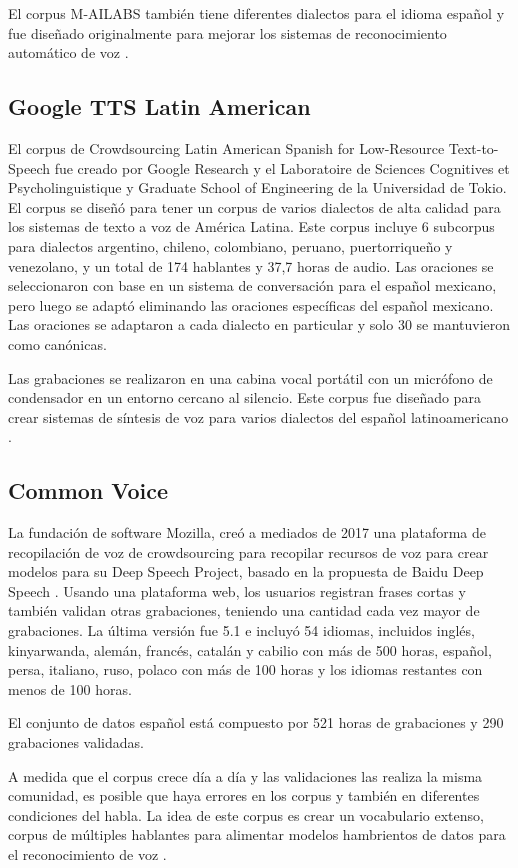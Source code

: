 El corpus M-AILABS también tiene diferentes dialectos para el idioma español y fue diseñado originalmente para mejorar los sistemas de reconocimiento automático de voz \cite{M-AILABS}.

\subsection{Google TTS Latin American}

El corpus de Crowdsourcing Latin American Spanish for Low-Resource Text-to-Speech fue creado por Google Research y el Laboratoire de Sciences Cognitives et Psycholinguistique y Graduate School of Engineering de la Universidad de Tokio. El corpus se diseñó para tener un corpus de varios dialectos de alta calidad para los sistemas de texto a voz de América Latina. Este corpus incluye 6 subcorpus para dialectos argentino, chileno, colombiano, peruano, puertorriqueño y venezolano, y un total de 174 hablantes y 37,7 horas de audio. Las oraciones se seleccionaron con base en un sistema de conversación para el español mexicano, pero luego se adaptó eliminando las oraciones específicas del español mexicano. Las oraciones se adaptaron a cada dialecto en particular y solo 30 se mantuvieron como canónicas.

Las grabaciones se realizaron en una cabina vocal portátil con un micrófono de condensador en un entorno cercano al silencio. Este corpus fue diseñado para crear sistemas de síntesis de voz para varios dialectos del español latinoamericano \cite{googleTTSLatinAmericanSpanishCorpus}.

\subsection{Common Voice}

La fundación de software Mozilla, creó a mediados de 2017 una plataforma de recopilación de voz de crowdsourcing para recopilar recursos de voz para crear modelos para su Deep Speech Project, basado en la propuesta de Baidu Deep Speech \cite{deepspeeh}. Usando una plataforma web, los usuarios registran frases cortas y también validan otras grabaciones, teniendo una cantidad cada vez mayor de grabaciones. La última versión fue 5.1 e incluyó 54 idiomas, incluidos inglés, kinyarwanda, alemán, francés, catalán y cabilio con más de 500 horas, español, persa, italiano, ruso, polaco con más de 100 horas y los idiomas restantes con menos de 100 horas.

El conjunto de datos español está compuesto por 521 horas de grabaciones y 290 grabaciones validadas.

A medida que el corpus crece día a día y las validaciones las realiza la misma comunidad, es posible que haya errores en los corpus y también en diferentes condiciones del habla. La idea de este corpus es crear un vocabulario extenso, corpus de múltiples hablantes para alimentar modelos hambrientos de datos para el reconocimiento de voz \cite{Common-Voice}.
